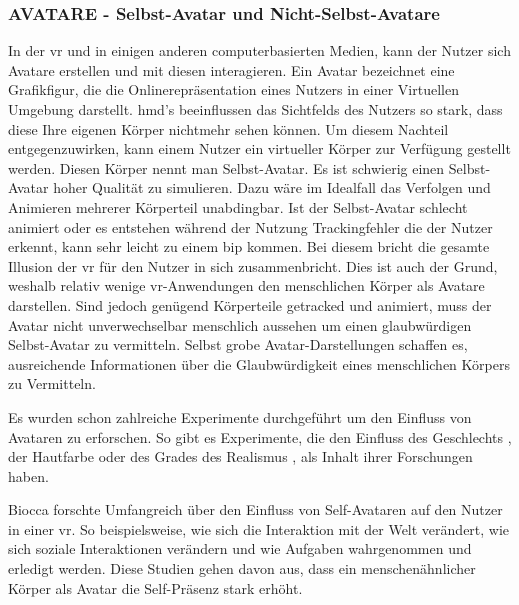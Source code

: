 \documentclass[a4paper,11pt]{article}%
\renewcommand{\\}{\vspace*{0.5\baselineskip} \newline}
\begin{document}
		\subsubsection{AVATARE - Selbst-Avatar und Nicht-Selbst-Avatare}

In der \ac{vr} und in einigen anderen computerbasierten Medien, kann der Nutzer sich Avatare erstellen und mit diesen interagieren. Ein Avatar bezeichnet eine Grafikfigur, die die Onlinerepräsentation eines Nutzers in einer Virtuellen Umgebung darstellt. \citep[p.1]{neustaedter2009presenting} \\
\ac{hmd}'s beeinflussen das Sichtfelds des Nutzers so stark, dass diese Ihre eigenen Körper nichtmehr sehen können. Um diesem Nachteil entgegenzuwirken, kann einem Nutzer ein virtueller Körper zur Verfügung gestellt werden. Diesen Körper nennt man Selbst-Avatar.
Es ist schwierig einen Selbst-Avatar hoher Qualität zu simulieren. Dazu wäre im Idealfall das Verfolgen und Animieren mehrerer Körperteil unabdingbar. Ist der Selbst-Avatar schlecht animiert oder es entstehen während der Nutzung Trackingfehler die der Nutzer erkennt, kann sehr leicht zu einem \ac{bip} kommen. Bei diesem bricht die gesamte Illusion der \ac{vr} für den Nutzer in sich zusammenbricht. 
Dies ist auch der Grund, weshalb relativ wenige \ac{vr}-Anwendungen den menschlichen Körper als Avatare darstellen.
Sind jedoch genügend Körperteile getracked und animiert, muss der Avatar nicht unverwechselbar menschlich aussehen um einen glaubwürdigen Selbst-Avatar zu vermitteln. Selbst grobe Avatar-Darstellungen schaffen es, ausreichende Informationen über die Glaubwürdigkeit eines menschlichen Körpers zu Vermitteln.\citep{lok2003effects}

Es wurden schon zahlreiche Experimente durchgeführt um den Einfluss von Avataren zu erforschen. So gibt es Experimente, die den Einfluss des Geschlechts \cite{slater2010first}, der Hautfarbe \cite{peck2013putting} oder des Grades des Realismus \cite{roth2016avatar}, als Inhalt ihrer Forschungen haben.

Biocca forschte Umfangreich über den Einfluss von Self-Avataren auf den Nutzer in einer \ac{vr}. \citep[421-427]{construal2014connected} 
\newline So beispielsweise, wie sich die Interaktion mit der Welt verändert, wie sich soziale Interaktionen verändern und wie Aufgaben wahrgenommen und erledigt werden. \citep{benford1995user} \citep{bowers1996talk}
Diese Studien gehen davon aus, dass ein menschenähnlicher Körper als Avatar die Self-Präsenz stark erhöht.
\end{document}
